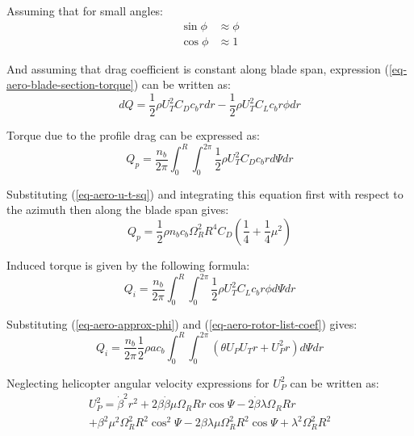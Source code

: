 Assuming that for small angles:
\begin{align}
  \sin \phi &\approx \phi \\
  \cos \phi &\approx 1
\end{align}

And assuming that drag coefficient is constant along blade span, expression (\ref{eq-aero-blade-section-torque}) can be written as: \cite{GessowMyers1985, Bramwell2001}
\begin{equation}
  dQ =
  \frac{1}{2} \rho U_T^2 C_D c_b r dr -
  \frac{1}{2} \rho U_T^2 C_L c_b r \phi dr
\end{equation}

Torque due to the profile drag can be expressed as: \cite{Bramwell2001}
\begin{equation}
  Q_p = \frac{n_b}{2\pi}
  \int_{0}^{R} \int_{0}^{2\pi} \frac{1}{2} \rho U_T^2 C_D c_b r d \Psi dr
\end{equation}

Substituting (\ref{eq-aero-u-t-sq}) and integrating this equation first with respect to the azimuth then along the blade span gives:
\begin{equation}
  Q_p = \frac{1}{2} \rho n_b c_b \Omega_R^2 R^4 C_D
  \left( \frac{1}{4} + \frac{1}{4} \mu^2 \right)
\end{equation}

Induced torque is given by the following formula: \cite{Bramwell2001}
\begin{equation}
  Q_i = \frac{n_b}{2\pi} \int_{0}^{R} \int_{0}^{2\pi}
  \frac{1}{2} \rho U_T^2 C_L c_b r \phi d \Psi dr
\end{equation}

Substituting (\ref{eq-aero-approx-phi}) and (\ref{eq-aero-rotor-list-coef}) gives:
\begin{equation}
  \label{eq-aero-q-i}
  Q_i = \frac{n_b}{2\pi} \frac{1}{2} \rho a c_b
  \int_{0}^{R} \int_{0}^{2\pi}
  \left( \theta U_P U_T r + U_P^2 r \right) d \Psi dr
\end{equation}

Neglecting helicopter angular velocity expressions for $U_P^2$ can be written as:
\begin{multline}
  \label{eq-aero-u-p-sq}
  U_P^2 = \dot \beta^2 r^2
  + 2 \beta \dot \beta \mu \Omega_R R r \cos \Psi
  - 2 \dot \beta \lambda \Omega_R R r \\
  + \beta^2 \mu^2 \Omega_R^2 R^2 \cos^2 \Psi
  - 2 \beta \lambda \mu \Omega_R^2 R^2 \cos \Psi
  + \lambda^2 \Omega_R^2 R^2
\end{multline}

